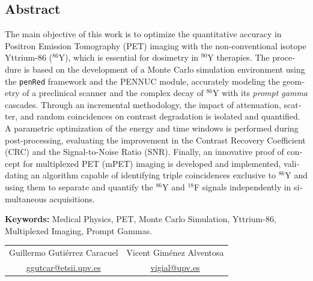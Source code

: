 \begin{otherlanguage}{english}
	\chapter*{Abstract}
	The main objective of this work is to optimize the quantitative accuracy in Positron Emission Tomography (PET) imaging with the non-conventional isotope Yttrium-86 ($^{86}$Y), which is essential for dosimetry in $^{90}$Y therapies. The procedure is based on the development of a Monte Carlo simulation environment using the \texttt{penRed} framework and the PENNUC module, accurately modeling the geometry of a preclinical scanner and the complex decay of $^{86}$Y with its \textit{prompt gamma} cascades. Through an incremental methodology, the impact of attenuation, scatter, and random coincidences on contrast degradation is isolated and quantified. A parametric optimization of the energy and time windows is performed during post-processing, evaluating the improvement in the Contrast Recovery Coefficient (CRC) and the Signal-to-Noise Ratio (SNR). Finally, an innovative proof of concept for multiplexed PET (mPET) imaging is developed and implemented, validating an algorithm capable of identifying triple coincidences exclusive to $^{86}$Y and using them to separate and quantify the $^{86}$Y and $^{18}$F signals independently in simultaneous acquisitions.

	\vspace{0.5cm}
	\textbf{Keywords:} Medical Physics, PET, Monte Carlo Simulation, Yttrium-86, Multiplexed Imaging, Prompt Gammas.
\end{otherlanguage}

\vfill

\begin{center}
	\begin{tabular}{cc}
		Guillermo Gutiérrez Caracuel
		 &
		Vicent Giménez Alventosa
		\\
		\href{mailto:ggutcar@etsii.upv.es}{\small ggutcar@etsii.upv.es}
		 &
		\href{mailto:vigial@upv.es}{\small vigial@upv.es}
	\end{tabular}
\end{center}



